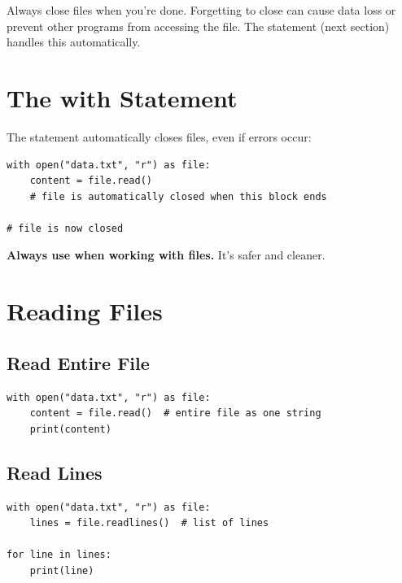 \begin{warning}
Always close files when you're done. Forgetting to close can cause data loss or prevent other programs from accessing the file. The  statement (next section) handles this automatically.
\end{warning}

\section{The with Statement}
\label{sec:with-statement}

The  statement automatically closes files, even if errors occur:

\begin{lstlisting}
with open("data.txt", "r") as file:
    content = file.read()
    # file is automatically closed when this block ends

# file is now closed
\end{lstlisting}

\textbf{Always use  when working with files.} It's safer and cleaner.

\section{Reading Files}
\label{sec:reading-files}

\subsection{Read Entire File}

\begin{lstlisting}
with open("data.txt", "r") as file:
    content = file.read()  # entire file as one string
    print(content)
\end{lstlisting}

\subsection{Read Lines}

\begin{lstlisting}
with open("data.txt", "r") as file:
    lines = file.readlines()  # list of lines

for line in lines:
    print(line)
\end{lstlisting}

